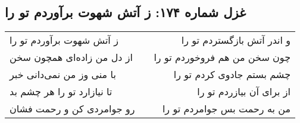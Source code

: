\begin{center}
\section*{غزل شماره ۱۷۴: ز آتش شهوت برآوردم تو را}
\label{sec:0174}
\begin{longtable}{l p{0.5cm} r}
ز آتش شهوت برآوردم تو را
&&
و اندر آتش بازگستردم تو را
\\
از دل من زاده‌ای همچون سخن
&&
چون سخن من هم فروخوردم تو را
\\
با منی وز من نمی‌دانی خبر
&&
چشم بستم جادوی کردم تو را
\\
تا نیازارد تو را هر چشم بد
&&
از برای آن بیازردم تو را
\\
رو جوامردی کن و رحمت فشان
&&
من به رحمت بس جوامردم تو را
\\
\end{longtable}
\end{center}
